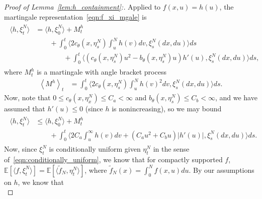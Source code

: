 \documentclass[EJP]{ejpecp} %
\newcommand{\IE}{\mathbb E}
\newcommand{\lp}{\xi}              %
\begin{document}
\begin{proof}[Proof of Lemma~\ref{lem:h_containment}:]
    Applied to $f(x, u) = h(u)$, the martingale representation~\eqref{eqn:f_xi_mgale} is
    \begin{align*}
    \begin{split}
        \langle h, \lp_t^N \rangle
        &=
        \langle h, \lp_0^N \rangle
        + M^{h}_t 
        \\ & \qquad {}
        +
        \int_0^t
        \big\langle
            2 c_\theta(x, \eta^N_s) \int_u^N h(v) dv
        ,
        \lp_s^N(dx, du) \big \rangle
        ds
        \\ & \qquad \qquad {}
        +
        \int_0^t
        \big\langle
            \left(
                c_\theta(x, \eta^N_s) u^2
                - b_\theta(x, \eta^N_s) u
            \right)
            h'(u)
        ,
        \lp_s^N(dx, du) \big \rangle
        ds ,
    \end{split}
    \end{align*}
    where $M^{h}_t$ is a martingale
    with angle bracket process
    \begin{align*}
        \left\langle M^{h} \right\rangle_t
        &=
        \int_0^t
        \langle 2 c_\theta(x, \eta_s^N) \int_u^N h(v)^2 dv
        ,
        \lp_s^N(dx, du) \big \rangle
        ds .
    \end{align*}
    Now, note that $0 \le c_\theta(x, \eta_x^N) \le C_a < \infty$
    and $b_\theta(x, \eta_s^N) \le C_b < \infty$,
    and we have assumed that $h'(u) \le 0$ (since $h$ is nonincreasing),
    so we may bound
    \begin{align} \label{eqn:hn_bound}
    \begin{split} 
        \langle h, \lp_t^N \rangle
        &\le
        \langle h, \lp_0^N \rangle
        + M^{h}_t
        \\ & \qquad {}
        +
        \int_0^t
        \big\langle
            2 C_a \int_u^\infty h(v) dv
            + \left( C_a u^2 + C_b u \right) |h'(u)|,
        \lp_s^N(dx, du) \big \rangle
        ds .
    \end{split}
    \end{align}
    Now, since $\lp_t^N$ is conditionally uniform given $\eta_t^N$
    in the sense of~\eqref{eqn:conditionally_uniform},
    we know that for compactly supported $f$,
    $\IE[\langle f, \lp^N_t \rangle] = \IE[\langle \widetilde{f}_N, \eta^N_t \rangle]$,
    where $\widetilde{f}_N(x) = \int_0^N f(x,u) du$.
    By our assumptions on $h$,
    we know that
    $$
$$
\end{proof}
\end{document}
